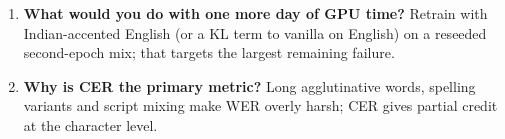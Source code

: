 \begin{enumerate}[leftmargin=*,label=\textbf{Q\arabic*.}]
\item \textbf{What would you do with one more day of GPU time?} Retrain with Indian-accented English (or a KL term to vanilla on
English) on a reseeded second-epoch mix; that targets the largest remaining failure.

\item \textbf{Why is CER the primary metric?} Long agglutinative words, spelling variants and script mixing make WER overly harsh;
CER gives partial credit at the character level.
\end{enumerate}
